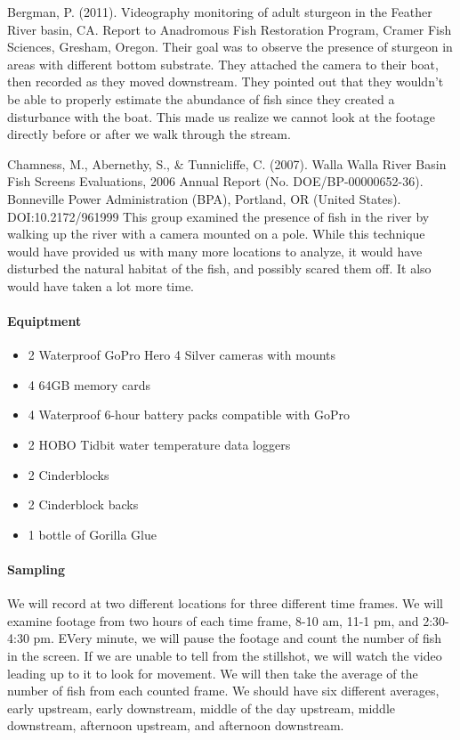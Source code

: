 \documentclass{tufte-handout}
\begin{document}
Bergman, P. (2011). Videography monitoring of adult sturgeon in the Feather River basin, CA. Report to Anadromous Fish Restoration Program, Cramer Fish Sciences, Gresham, Oregon.
Their goal was to observe the presence of sturgeon in areas with different bottom substrate.  They attached the camera to their boat, then recorded as they moved downstream.  They pointed out that they wouldn’t be able to properly estimate the abundance of fish since they created a disturbance with the boat.  This made us realize we cannot look at the footage directly before or after we walk through the stream.

Chamness, M., Abernethy, S., & Tunnicliffe, C. (2007). Walla Walla River Basin Fish Screens Evaluations, 2006 Annual Report (No. DOE/BP-00000652-36). Bonneville Power Administration (BPA), Portland, OR (United States).  DOI:10.2172/961999
This group examined the presence of fish in the river by walking up the river with a camera mounted on a pole.  While this technique would have provided us with many more locations to analyze, it would have disturbed the natural habitat of the fish, and possibly scared them off.  It also would have taken a lot more time.



\paragraph{Equiptment}  \begin{itemize}
\item 2 Waterproof GoPro Hero 4 Silver cameras with mounts
\item 4 64GB memory cards
\item 4 Waterproof 6-hour battery packs compatible with GoPro
\item 2 HOBO Tidbit water temperature data loggers
\item 2 Cinderblocks
\item 2 Cinderblock backs
\item 1 bottle of Gorilla Glue
\end{itemize}

\paragraph{Sampling} We will record at two different locations for three different time frames.  We will examine footage from two hours of each time frame, 8-10 am, 11-1 pm, and 2:30-4:30 pm.  EVery minute, we will pause the footage and count the number of fish in the screen.  If we are unable to tell from the stillshot, we will watch the video leading up to it to look for movement.  We will then take the average of the number of fish from each counted frame.  We should have six different averages, early upstream, early downstream, middle of the day upstream, middle downstream, afternoon upstream, and afternoon downstream.  
\end{document}
